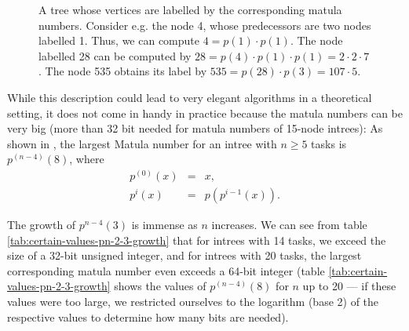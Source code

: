 \begin{description}
\begin{figure}[t]
  \caption{A tree whose vertices are labelled by the corresponding matula numbers. Consider e.g. the node 4, whose predecessors are two nodes labelled 1. Thus, we can compute $4=p(1)\cdot p(1)$. The node labelled 28 can be computed by $28 = p(4)\cdot p(1) \cdot p(1) = 2\cdot 2 \cdot 7$. The node 535 obtains its label by $535=p(28)\cdot p(3) = 107\cdot 5$.}
  \label{fig:matula-illustration}
\end{figure}

While this description could lead to very elegant algorithms in a theoretical setting, it does not come in handy in practice because the matula numbers can be very big (more than 32 bit needed for matula numbers of 15-node intrees): As shown in \cite{onmatulanumbers}, the largest Matula number for an intree with $n\geq 5$ tasks is $p^{(n-4)}(8)$, where
\begin{eqnarray*}
  p^{(0)} (x) &=& x, \\
  p^{i}(x) &=& p\left(p^{i-1}(x)\right).
\end{eqnarray*}

The growth of $p^{n-4}(3)$ is immense as $n$ increases. We can see from table \ref{tab:certain-values-pn-2-3-growth} that for intrees with 14 tasks, we exceed the size of a 32-bit unsigned integer, and for intrees with 20 tasks, the largest corresponding matula number even exceeds a 64-bit integer (table \ref{tab:certain-values-pn-2-3-growth} shows the values of $p^{(n-4)}(8)$ for $n$ up to 20 --- if these values were too large, we restricted ourselves to the logarithm (base 2) of the respective values to determine how many bits are needed).


\end{description}
